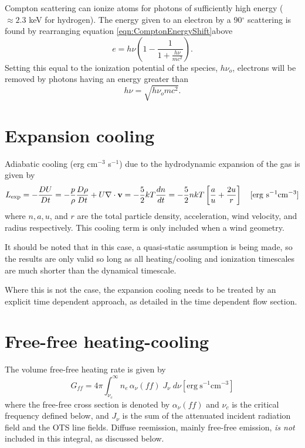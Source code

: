 Compton scattering can ionize atoms for photons of sufficiently high
energy ($\approx 2.3$ keV for hydrogen).  The energy given to an electron
by a 90$^{\circ}$
scattering is found by rearranging equation \ref{eqn:ComptonEnergyShift}above
\begin{equation}
e = h\nu \left( {1 - \frac{1}{{1 + \frac{{h\nu }}{{m{c^2}}}}}} \right).
\end{equation}
Setting this equal to the ionization potential of the species, $h{\nu _o}$,
electrons will be removed by photons having an energy greater than
\begin{equation}
h\nu  = \sqrt {h{\nu _o}m{c^2}}.
\end{equation}

\section{Expansion cooling }

Adiabatic cooling (erg cm$^{-3}$ s$^{-1}$) due to the hydrodynamic expansion of
the gas is given by
\begin{equation}
{L_{\rm exp}} =  - \frac{{DU}}{{Dt}} =  - \frac{p}{\rho }\frac{{D\rho
}}{{Dt}} + U\nabla  \cdot {\bf{v}} = -{5\over2} kT\frac{{dn}}{{dt}} 
= -{5\over2}nkT\left[
{\frac{a}{u} + \frac{{2u}}{r}} \right]\quad [\mathrm{erg~s}^{-1} \mathrm{cm}^{-3}]
\end{equation}
where $n, a, u$, and $r$ are the total particle density, acceleration,
wind velocity, and radius respectively.  This cooling term is only
included when a wind geometry.  

It should be noted that in this case, a quasi-static assumption is
being made, so the results are only valid so long as all
heating/cooling and ionization timescales are much shorter than the
dynamical timescale.  

Where this is not the case, the expansion cooling needs to be treated
by an explicit time dependent approach, as detailed in the time
dependent flow section.

\section{Free-free heating-cooling}

The volume free-free heating rate is given by
\begin{equation}
{G_{ff}} = 4\pi \int_{{\nu _c}}^\infty  {{n_e}\,{\alpha _\nu }\left( {ff}
\right)\;{J_\nu }\;d\nu } [\mathrm{erg~s}^{-1} \mathrm{cm}^{-3}]
\end{equation}
where the free-free cross section is denoted by $\alpha_\nu(ff)$ and $\nu_c$ is the critical
frequency defined below, and $J_{\nu}$ is the sum of the attenuated incident
radiation field and the OTS line fields.  Diffuse reemission, mainly
free-free emission, \emph{is not} included in this integral, as discussed below.


